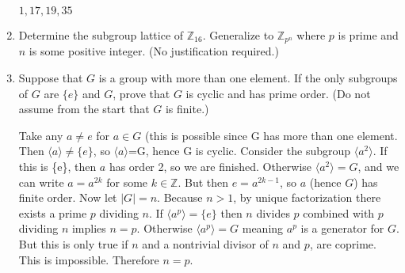 \documentclass{article}
\newcommand{\ZZ}{\mathbb{Z}}
\newcommand{\lr}[1]{\langle #1 \rangle}
\begin{document}
\begin{enumerate}
${1,17,19,35}$
    

    \item Determine the subgroup lattice of $\ZZ_{16}$. Generalize to $\ZZ_{p^n}$ where $p$ is prime and $n$ is some positive integer. (No justification required.)
    


    \item Suppose that $G$ is a group with more than one element. If the only subgroups of $G$ are $\{e\}$ and $G$, prove that $G$ is cyclic and has prime order. (Do not assume from the start that $G$ is finite.)

Take any $a\neq e$ for $a \in G$ (this is possible since G has more than one element. Then
$\lr{a}\neq \{e\}$, so $\lr{a}$=G, hence G is cyclic. Consider the subgroup $\lr{a^{2}}$. If this
is \{e\}, then $a$ has order 2, so we are finished. Otherwise $\lr{a^{2}}=G$, and we can write $a = a^{2k}$ for some $k \in \ZZ$. But then $e = a^{2k-1}$, so $a$ (hence $G$) has finite order. Now let $|G| = n$. Because $n > 1$, by unique factorization there exists a prime $p$ dividing $n$. If $\lr{a^{p}}=\{e\}$ then $n$ divides $p$ combined with $p$ dividing $n$ implies $n=p$. Otherwise $\lr{a^{p}} = G$ meaning $a^{p}$ is a generator for $G$. But this is only true if $n$ and a nontrivial divisor of $n$ and $p$, are coprime. This is impossible. Therefore $n = p$.
\end{enumerate}
\end{document}
